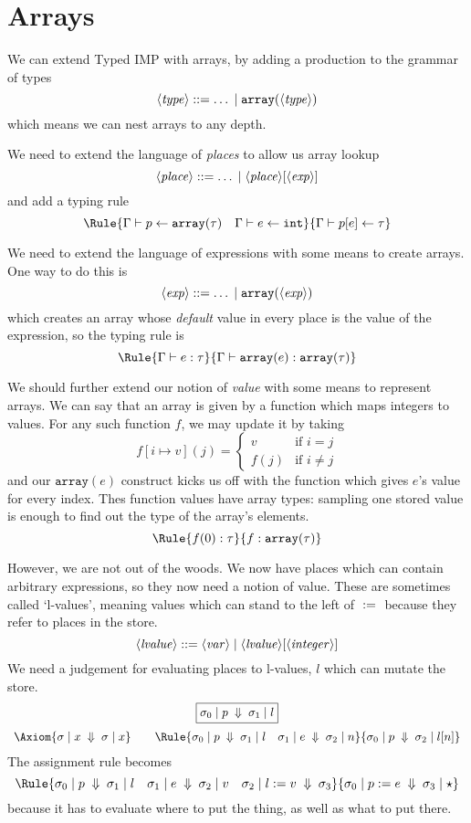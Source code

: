 \documentclass{article}
\begin{document}
\section{Arrays}

\newcommand{\arr}[1]{\mathtt{array}(#1)}
We can extend Typed IMP with arrays, by adding a production to the grammar
of types
\[
\NT{type} ::= \ldots \;|\; \arr{\NT{type}}
\]
which means we can nest arrays to any depth.

We need to extend the language of \emph{places} to allow us array lookup
\[
  \langle \mathit{place} \rangle ::= \ldots \;|\; \langle \mathit{place} \rangle[\langle \mathit{exp} \rangle]
\]
and add a typing rule
\[\Rule{\JPl\Gamma p{\arr{\tau}}\quad \JPl\Gamma e\intg}
       {\JPl\Gamma{p[e]}\tau}
\]

We need to extend the language of expressions with some means to
create arrays. One way to do this is
\[
  \NT{exp} ::= \ldots \;|\; \arr{\NT{exp}}
\]
which creates an array whose \emph{default} value in every place is the value of the expression, so the typing rule is
\[
  \Rule{\JEx\Gamma e\tau}
       {\JEx\Gamma{\arr{e}}{\arr{\tau}}}
\]
     
We should further extend our notion of \emph{value} with some means to represent arrays. We can say that an array is given by a function which maps integers to values. For any such function $f$, we may update it by taking
\[f[i\mapsto v](j) = \left\{\begin{array}{ll}
                              v & \mbox{if $i = j$} \\
                              f(j) & \mbox{if $i \neq j$}
                              \end{array}\right.
\]
and our $\arr{e}$ construct kicks us off with the function which gives
$e$'s value for every index. Thes function values have array types: sampling
one stored value is enough to find out the type of the array's elements.
\[\Rule{f(0):\tau}
       {f:\arr\tau}
  \]

However, we are not out of the woods. We now have places which can contain
arbitrary expressions, so they now need a notion of value. These are
sometimes called `l-values', meaning values which can stand to the left of $\;\mathtt{:=}\;$
because they refer to places in the store.
\[
  \langle \mathit{lvalue} \rangle ::= \langle \mathit{var} \rangle \;|\;\langle \mathit{lvalue} \rangle[\langle \mathit{integer} \rangle]
\]
We need a judgement for evaluating places to l-values, $l$ which can mutate the
store.
\[\begin{array}{c}
    \fbx{\JEv{\sigma_0}{p}{\sigma_1}{l}} \medskip \\
    \Axiom{\JEv{\sigma}x{\sigma}x} \qquad
    \Rule{\JEv{\sigma_0}p{\sigma_1}l\quad
    \JEv{\sigma_1}e{\sigma_2}n}
    {\JEv{\sigma_0}p{\sigma_2}{l[n]}}
  \end{array}  \]
The assignment rule
becomes
\[\Rule{\JEv{\sigma_0}p{\sigma_1}l\quad\JEv{\sigma_1}e{\sigma_2}v\quad\JPla{\sigma_2}lv{\sigma_3}}
  {\JEv{\sigma_0}{p\ass e}{\sigma_3}\star}
\]
because it has to evaluate where to put the thing, as well as what to put there.
\end{document}
